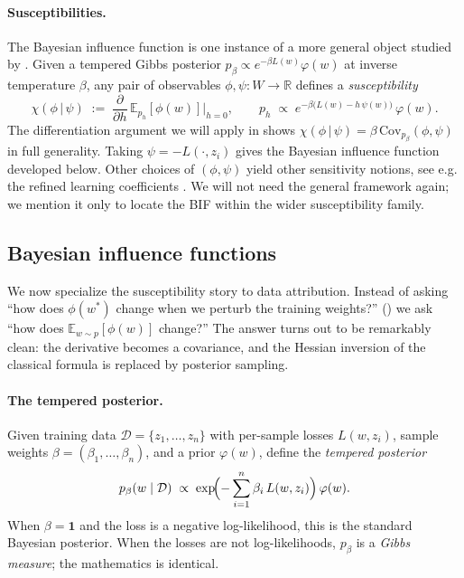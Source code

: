 \documentclass[11pt]{article}
\newcommand{\R}{\mathbb{R}}
\newcommand{\E}{\mathbb{E}}
\begin{document}
\paragraph{Susceptibilities.} The Bayesian influence function is one instance of a more general object studied by \citet{baker2025studying}. Given a tempered Gibbs posterior $p_\beta \propto e^{-\beta L(w)}\varphi(w)$ at inverse temperature $\beta$, any pair of observables $\phi,\psi:W\to\R$ defines a \emph{susceptibility}
\begin{equation}\label{eq:susceptibility}
  \chi(\phi\,|\,\psi) \;:=\; \frac{\partial}{\partial h}\,\E_{p_h}[\phi(w)]\bigg|_{h=0}, \qquad p_h \;\propto\; e^{-\beta\bigl(L(w) - h\,\psi(w)\bigr)}\,\varphi(w).
\end{equation}
The differentiation argument we will apply in  shows $\chi(\phi\,|\,\psi) = \beta\,\mathrm{Cov}_{p_\beta}(\phi,\psi)$ in full generality. Taking $\psi = -L(\cdot,z_i)$ gives the Bayesian influence function developed below. Other choices of $(\phi,\psi)$ yield other sensitivity notions, see e.g. the refined learning coefficients \citep[Appendix~D.2]{baker2025studying}. We will not need the general framework again; we mention it only to locate the BIF within the wider susceptibility family.

\subsection{Bayesian influence functions}\label{subsec:bif}

We now specialize the susceptibility story to data attribution. Instead of asking ``how does $\phi(w^*)$ change when we perturb the training weights?'' () we ask ``how does $\E_{w\sim p}[\phi(w)]$ change?'' The answer turns out to be remarkably clean: the derivative becomes a covariance, and the Hessian inversion of the classical formula is replaced by posterior sampling.

\paragraph{The tempered posterior.} Given training data $\mathcal{D} = \{z_1,\dots,z_n\}$ with per-sample losses $L(w,z_i)$, sample weights $\beta = (\beta_1,\dots,\beta_n)$, and a prior $\varphi(w)$, define the \emph{tempered posterior}
\begin{equation}\label{eq:tempered-posterior}
  p_\beta(w\mid\mathcal{D}) \;\propto\; \exp\!\Bigl(-\sum_{i=1}^n \beta_i\, L(w,z_i)\Bigr)\,\varphi(w).
\end{equation}
When $\beta = \mathbf{1}$ and the loss is a negative log-likelihood, this is the standard Bayesian posterior. When the losses are not log-likelihoods, $p_\beta$ is a \emph{Gibbs measure}; the mathematics is identical.
\end{document}
